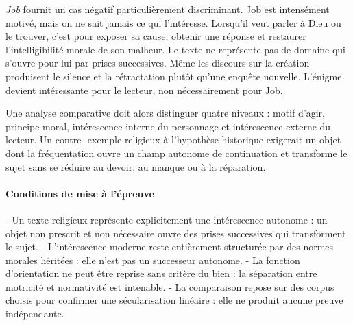 \documentclass[10pt,a4paper]{article}
\begin{document}
\emph{Job} fournit un cas négatif particulièrement discriminant. Job est intensément motivé, mais on ne sait jamais ce qui l'intéresse. Lorsqu'il veut parler à Dieu ou le trouver, c'est pour exposer sa cause, obtenir une réponse et restaurer l'intelligibilité morale de son malheur. Le texte ne représente pas de domaine qui s'ouvre pour lui par prises successives. Même les discours sur la création produisent le silence et la rétractation plutôt qu'une enquête nouvelle. L'énigme devient intéressante pour le lecteur, non nécessairement pour Job.

Une analyse comparative doit alors distinguer quatre niveaux : motif d'agir, principe moral, intérescence interne du personnage et intérescence externe du lecteur. Un contre- exemple religieux à l'hypothèse historique exigerait un objet dont la fréquentation ouvre un champ autonome de continuation et transforme le sujet sans se réduire au devoir, au manque ou à la réparation.

\paragraph{Conditions de mise à l'épreuve}
- Un texte religieux représente explicitement une intérescence autonome : un objet   non prescrit et non nécessaire ouvre des prises successives qui transforment le sujet. - L'intérescence moderne reste entièrement structurée par des normes morales héritées :   elle n'est pas un successeur autonome. - La fonction d'orientation ne peut être reprise sans critère du bien : la séparation   entre motricité et normativité est intenable. - La comparaison repose sur des corpus choisis pour confirmer une sécularisation   linéaire : elle ne produit aucune preuve indépendante.
\end{document}
